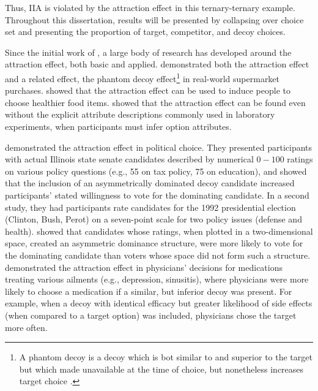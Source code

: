 Thus, IIA is violated by the attraction effect in this ternary-ternary example. Throughout this dissertation, results will be presented by collapsing over choice set and presenting the proportion of target, competitor, and decoy choices.

Since the initial work of \textcite{huberAddingAsymmetricallyDominated1982d}, a large body of research has developed around the attraction effect, both basic and applied. \textcite{doyleRobustnessAsymmetricallyDominated1999} demonstrated both the attraction effect and a related effect, the phantom decoy effect\footnote{A phantom decoy is a decoy which is bot similar to and superior to the target but which made unavailable at the time of choice, but nonetheless increases target choice \parencite{pratkanisBriefHistoryResearch1992b}.} in real-world supermarket purchases. \textcite{van2021attract} showed that the attraction effect can be used to induce people to choose healthier food items. \textcite{slaughterDecoyEffectsAttributelevel1999b} showed that the attraction effect can be found even without the explicit attribute descriptions commonly used in laboratory experiments, when participants must infer option attributes. 

\textcite{o1995attraction} demonstrated the attraction effect in political choice. They presented participants with actual Illinois state senate candidates described by numerical $0-100$ ratings on various policy questions (e.g., 55 on tax policy, 75 on education), and showed that the inclusion of an asymmetrically dominated decoy candidate increased participants' stated willingness to vote for the dominating candidate. In a second study, they had participants rate candidates for the 1992 presidential election (Clinton, Bush, Perot) on a seven-point scale for two policy issues (defense and health). \textcite{o1995attraction} showed that candidates whose ratings, when plotted in a two-dimensional space, created an asymmetric dominance structure, were more likely to vote for the dominating candidate than voters whose space did not form such a structure. \textcite{schwartz1999more} demonstrated the attraction effect in physicians' decisions for medications treating various ailments (e.g., depression, sinusitis), where physicians were more likely to choose a medication if a similar, but inferior decoy was present. For example, when a decoy with identical efficacy but greater likelihood of side effects (when compared to a target option) was included, physicians chose the target more often.

